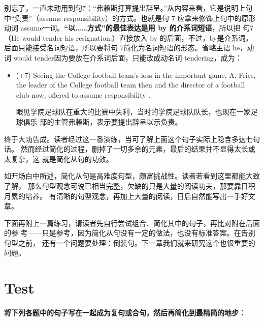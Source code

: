 别忘了，一直未动用到句7：“弗赖斯打算提出辞呈。”从内容来看，它是说明上句
中“负责”（assume responsibility）的方式。也就是句 7 应拿来修饰上句中的原形
动词 assume一词。\textbf{“以……方式”的最佳表达是用 by 的介系词短语}，所以把
句7（He would tender his resignation.）直接放入 by 的后面，不过，by是介系词，
后面只能接受名词短语，所以要将句 7简化为名词短语的形态。省略主语 he，动
词 would tender因为要放在介系词后面，只能改成动名词 tendering，成为：
\begin{itemize}
\item (+7) Seeing the College football team's loss in the important game, A.
  Fries, the leader of the College football team then and the director of a
  football club now, offered to assume responsibility .

  眼见学院足球队在重大的比赛中失利，当时的学院足球队队长，也现在一家足球俱乐
  部的主管弗赖斯，表示要提出辞呈以示负责。
\end{itemize}
终于大功告成。读者经过这一番演练，当可了解上面这个句子实际上隐含多达七句话。
然而经过简化的过程，删掉了一切多余的元素，最后的结果并不显得太长或太复杂，这
就是简化从句的功效。

如开场白中所述，简化从句是高难度句型，颇富挑战性。读者若看到这里都能大致了解，
那么句型观念可说已相当完整，欠缺的只是大量的阅读功夫，那要靠日积月累的培养。
有清晰的句型观念，再加上大量的阅读，日后自然能写出一手好文章。

下面再附上一篇练习，请读者先自行尝试组合、简化其中的句子，再比对附在后面的参
考——只是参考，因为简化从句没有一定的做法，也没有标准答案。在告别句型之前，
还有一个问题要处理：倒装句。下一章我们就来研究这个也很重要的问题。

\section{Test}

\paragraph{将下列各题中的句子写在一起成为复句或合句，然后再简化到最精简的地步：}

